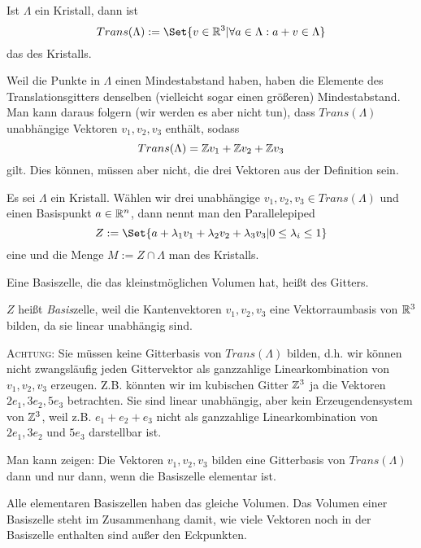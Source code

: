 \begin{definition}
Ist $\Lambda$ ein Kristall, dann ist
\[Trans(\Lambda) := \Set{v\in\IR^3 | \forall a\in\Lambda: a+v\in\Lambda}\]
das  des Kristalls.
\end{definition}

\begin{remark}
Weil die Punkte in $\Lambda$ einen Mindestabstand haben, haben die Elemente des Translationsgitters denselben (vielleicht sogar einen größeren) Mindestabstand. Man kann daraus folgern (wir werden es aber nicht tun), dass $Trans(\Lambda)$ unabhängige Vektoren $v_1,v_2,v_3$ enthält, sodass
\[Trans(\Lambda) = \mathbb{Z} v_1+\mathbb{Z} v_2+\mathbb{Z} v_3\]
gilt. Dies können, müssen aber nicht, die drei Vektoren aus der Definition sein.
\end{remark}

\begin{definition}
Es sei $\Lambda$ ein Kristall. Wählen wir drei unabhängige $v_1,v_2,v_3\in Trans(\Lambda)$ und einen Basispunkt $a\in\mathbb{R}^n$, dann nennt man den Parallelepiped
\[Z:=\Set{a+\lambda_1 v_1 + \lambda_2 v_2 + \lambda_3 v_3 | 0\leq \lambda_i \leq 1}\]
eine  und die Menge $M:=Z\cap\Lambda$ man  des Kristalls.

Eine Basiszelle, die das kleinstmöglichen Volumen hat, heißt  des Gitters.
\end{definition}

\begin{remark}
$Z$ heißt \emph{Basis}zelle, weil die Kantenvektoren $v_1,v_2,v_3$ eine Vektorraumbasis von $\mathbb{R}^3$ bilden, da sie linear unabhängig sind.

\textsc{Achtung}: Sie müssen keine Gitterbasis von $Trans(\Lambda)$ bilden, d.h. wir können nicht zwangsläufig jeden Gittervektor als ganzzahlige Linearkombination von $v_1,v_2,v_3$ erzeugen. Z.B. könnten wir im kubischen Gitter $\mathbb{Z}^3$ ja die Vektoren $2e_1,3e_2,5e_3$ betrachten. Sie sind linear unabhängig, aber kein Erzeugendensystem von $\mathbb{Z}^3$, weil z.B. $e_1+e_2+e_3$ nicht als ganzzahlige Linearkombination von $2e_1, 3e_2$ und $5e_3$ darstellbar ist.
\end{remark}

\begin{remark}
Man kann zeigen: Die Vektoren $v_1,v_2,v_3$ bilden eine Gitterbasis von $Trans(\Lambda)$ dann und nur dann, wenn die Basiszelle elementar ist.

Alle elementaren Basiszellen haben das gleiche Volumen. Das Volumen einer Basiszelle steht im Zusammenhang damit, wie viele Vektoren noch in der Basiszelle enthalten sind außer den Eckpunkten.
\end{remark}

